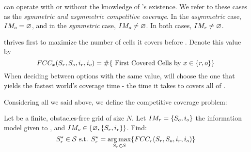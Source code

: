\opp can operate with or without the knowledge of \rob's existence. We refer to these cases as the {\em symmetric and asymmetric competitive coverage}.
In the {\em asymmetric} case, $IM_o=\varnothing$, and in the {\em symmetric} case, $IM_o \neq \varnothing$. In both cases, $IM_r \neq \varnothing $.

\rob thrives first to maximize the number of cells it covers before \opp. Denote this value by  
\[
FCC_{x}(S_r, S_o, i_r, i_o )=
\# \lbrace \textnormal{ First Covered Cells by } x \in \lbrace r,o\rbrace \rbrace 
\]
When deciding between options with the same \fcc value, \rob will choose the one that yields the fastest world's coverage time - the time it takes \rob to covers all of \w.

Considering all we said above, we define the competitive coverage problem:

\begin{definition}
\begin{mdframed}[backgroundcolor=gray!20] 
Let \w be a finite, obstacles-free grid of size $N$. Let $IM_r=\lbrace S_o ,i_o \rbrace$ the information model given to \rob, and $IM_o \in \lbrace \varnothing, \lbrace S_r, i_r \rbrace \rbrace$. Find: \[ S_r^\star \in \mathcal{S} \textnormal{ s.t. } S_r^\star =\operatorname*{arg\,max}_{S_r\in\mathcal{S}} \lbrace FCC_{r}(S_r, S_o, i_r, i_o ) \rbrace\]
\end{mdframed}
\end{definition}